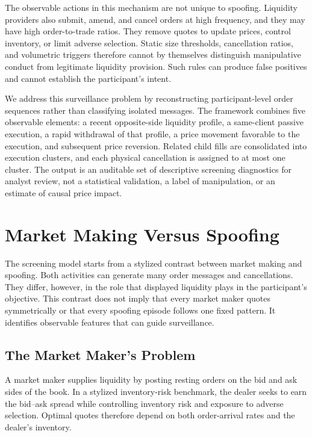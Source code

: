\documentclass[11pt]{article}
\begin{document}
The observable actions in this mechanism are not unique to spoofing. Liquidity providers also submit, amend, and cancel
orders at high frequency, and they may have high order-to-trade ratios. They remove quotes to update prices,
control inventory, or limit adverse selection. Static size thresholds, cancellation ratios, and volumetric triggers
therefore cannot by themselves distinguish manipulative conduct from legitimate liquidity provision. Such rules can
produce false positives and cannot establish the participant's intent.

We address this surveillance problem by reconstructing participant-level order sequences rather than classifying isolated
messages. The framework combines five observable elements: a recent opposite-side liquidity profile, a same-client
passive execution, a rapid withdrawal of that profile, a price movement favorable to the execution, and subsequent price
reversion. Related child fills are consolidated into execution clusters, and each physical cancellation is assigned to at
most one cluster. The output is an auditable set of descriptive screening diagnostics for analyst review, not a statistical
validation, a label of manipulation, or an estimate of causal price impact.

\section{Market Making Versus Spoofing}
\label{sec:mm_vs_spoofing}
The screening model starts from a stylized contrast between market making and spoofing. Both activities can generate many
order messages and cancellations. They differ, however, in the role that displayed liquidity plays in the participant's
objective. This contrast does not imply that every market maker quotes symmetrically or that every spoofing episode follows
one fixed pattern. It identifies observable features that can guide surveillance.

\subsection{The Market Maker's Problem}
\label{subsec:market_maker}
A market maker supplies liquidity by posting resting orders on the bid and ask sides of the book. In a stylized
inventory-risk benchmark, the dealer seeks to earn the bid--ask spread while controlling inventory risk and exposure to
adverse selection. Optimal quotes therefore depend on both order-arrival rates and the dealer's inventory.
\end{document}
